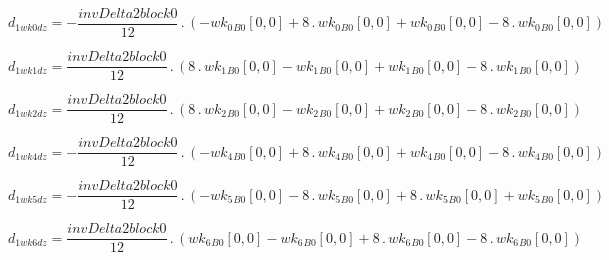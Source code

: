 \documentclass{article}
\begin{document}
\begin{dmath}d_{1 wk0 dz} = - \frac{invDelta2block0}{12} \,.\, \left(- {wk_{0}{_{B0}}}[{0,0}] + 8 \,.\, {wk_{0}{_{B0}}}[{0,0}] + {wk_{0}{_{B0}}}[{0,0}] - 8 \,.\, {wk_{0}{_{B0}}}[{0,0}]\right)\end{dmath}

\begin{dmath}d_{1 wk1 dz} = \frac{invDelta2block0}{12} \,.\, \left(8 \,.\, {wk_{1}{_{B0}}}[{0,0}] - {wk_{1}{_{B0}}}[{0,0}] + {wk_{1}{_{B0}}}[{0,0}] - 8 \,.\, {wk_{1}{_{B0}}}[{0,0}]\right)\end{dmath}

\begin{dmath}d_{1 wk2 dz} = \frac{invDelta2block0}{12} \,.\, \left(8 \,.\, {wk_{2}{_{B0}}}[{0,0}] - {wk_{2}{_{B0}}}[{0,0}] + {wk_{2}{_{B0}}}[{0,0}] - 8 \,.\, {wk_{2}{_{B0}}}[{0,0}]\right)\end{dmath}

\begin{dmath}d_{1 wk4 dz} = - \frac{invDelta2block0}{12} \,.\, \left(- {wk_{4}{_{B0}}}[{0,0}] + 8 \,.\, {wk_{4}{_{B0}}}[{0,0}] + {wk_{4}{_{B0}}}[{0,0}] - 8 \,.\, {wk_{4}{_{B0}}}[{0,0}]\right)\end{dmath}

\begin{dmath}d_{1 wk5 dz} = - \frac{invDelta2block0}{12} \,.\, \left(- {wk_{5}{_{B0}}}[{0,0}] - 8 \,.\, {wk_{5}{_{B0}}}[{0,0}] + 8 \,.\, {wk_{5}{_{B0}}}[{0,0}] + {wk_{5}{_{B0}}}[{0,0}]\right)\end{dmath}

\begin{dmath}d_{1 wk6 dz} = \frac{invDelta2block0}{12} \,.\, \left({wk_{6}{_{B0}}}[{0,0}] - {wk_{6}{_{B0}}}[{0,0}] + 8 \,.\, {wk_{6}{_{B0}}}[{0,0}] - 8 \,.\, {wk_{6}{_{B0}}}[{0,0}]\right)\end{dmath}
\end{document}
